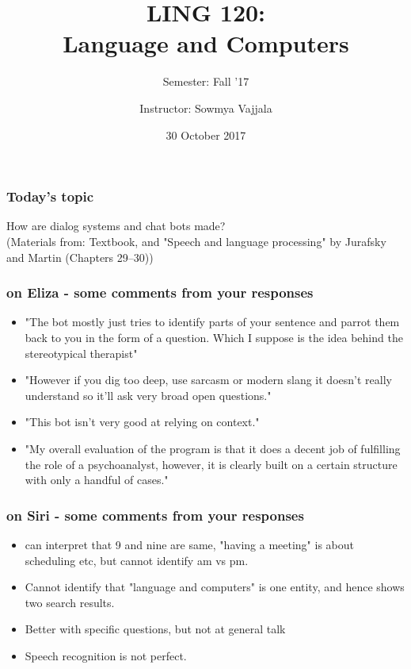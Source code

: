 \documentclass{beamer}
\author[Sowmya Vajjala]{Instructor: Sowmya Vajjala}
\title[LING 120]{LING 120: \\ Language and Computers}
\subtitle{Semester: Fall '17}
\date{30 October 2017}
\institute{Iowa State University, USA}
\begin{document}
\begin{frame}\titlepage
\end{frame}

\begin{frame}
\frametitle{Today's topic}
\begin{center}
\Large How are dialog systems and chat bots made?
\tiny \\
(Materials from: Textbook, and "Speech and language processing" by Jurafsky and Martin (Chapters 29--30))
\end{center}
\end{frame}

\begin{frame}
\frametitle{on Eliza - some comments from your responses}
\begin{itemize}
\item "The bot mostly just tries to identify parts of your sentence and parrot them back to you in the form of a question. Which I suppose is the idea behind the stereotypical therapist"
\item "However if you dig too deep, use sarcasm or modern slang it doesn't really understand so it'll ask very broad open questions."
\item "This bot isn't very good at relying on context."
\item "My overall evaluation of the program is that it does a decent job of fulfilling the role of a psychoanalyst, however, it is clearly built on a certain structure with only a handful of cases."
\end{itemize}
\end{frame}

\begin{frame}
\frametitle{on Siri - some comments from your responses}
\begin{itemize}
\item can interpret that 9 and nine are same, "having a meeting" is about scheduling etc, but cannot identify am vs pm.
\item Cannot identify that "language and computers" is one entity, and hence shows two search results.
\item Better with specific questions, but not at general talk
\item Speech recognition is not perfect.
\end{itemize}
\end{frame}
\end{document}
